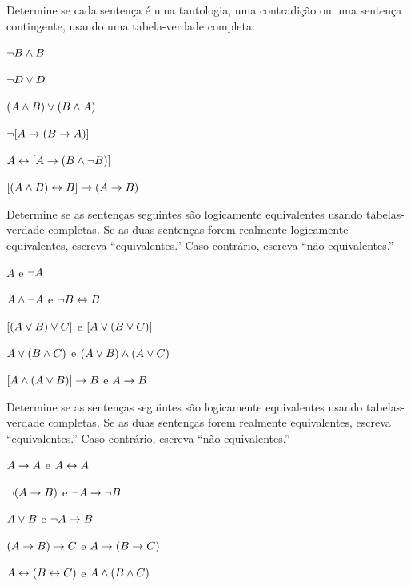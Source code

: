 \problempart Determine se cada sentença é uma tautologia, uma contradição ou uma sentença contingente, usando uma tabela-verdade completa.
\begin{compactlist}
\item $\neg B \wedge B$ \vspace{.5ex} \hfill {}


\item $\neg D \vee D$ \vspace{.5ex} \hfill {}


\item $(A\wedge B) \vee (B\wedge A)$\vspace{.5ex} \hfill {}


\item $\neg[A \rightarrow (B \rightarrow A)]$\vspace{.5ex} \hfill {}


\item $A \leftrightarrow [A \rightarrow (B \wedge \neg B)]$ \vspace{.5ex} \hfill {}


\item $[(A \wedge B) \leftrightarrow B] \rightarrow (A \rightarrow B)$ \vspace{.5ex} \hfill {}


\end{compactlist}

\noindent\problempart
\label{pr.TT.equiv}
Determine se as sentenças seguintes são logicamente equivalentes usando tabelas-verdade completas. Se as duas sentenças forem realmente logicamente equivalentes, escreva ``equivalentes.'' Caso contrário, escreva ``não equivalentes.'' 
\begin{compactlist}
\item $A$ e $\neg A$
\item $A \wedge \neg A$ e $\neg B \leftrightarrow B$
\item $[(A \vee B) \vee C]$ e $[A \vee (B \vee C)]$
\item $A \vee (B \wedge C)$ e $(A \vee B) \wedge (A \vee C)$
\item $[A \wedge (A \vee B)] \rightarrow B$ e $A \rightarrow B$\end{compactlist}


\problempart
\label{pr.TT.equiv2}
Determine se as sentenças seguintes são logicamente equivalentes usando tabelas-verdade completas. Se as duas sentenças forem realmente equivalentes, escreva ``equivalentes.'' Caso contrário, escreva ``não equivalentes.''
\begin{compactlist}
\item $A\rightarrow A$ e $A \leftrightarrow A$
\item $\neg(A \rightarrow B)$ e $\neg A \rightarrow \neg B$
\item $A \vee B$ e $\neg A \rightarrow B$
\item$(A \rightarrow B) \rightarrow C$ e $A \rightarrow (B \rightarrow C)$
\item $A \leftrightarrow (B \leftrightarrow C)$ e $A \wedge (B \wedge C)$
\end{compactlist}


